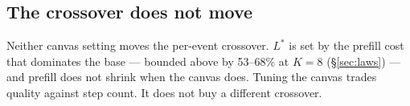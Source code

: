 \subsection{The crossover does not move}

Neither canvas setting moves the per-event crossover. $L^{*}$ is set by the
prefill cost that dominates the base --- bounded above by 53--68\% at $K{=}8$
(\S\ref{sec:laws}) --- and prefill does not shrink when the canvas does.
Tuning the canvas trades quality against step count. It does not buy a
different crossover.
